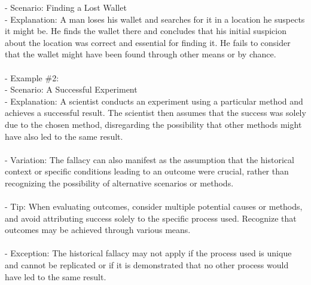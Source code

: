\documentclass[a4paper,12pt,single,pdftex]{scrbook}
\begin{document}
    
        - Scenario: Finding a Lost Wallet
    \\

    
        - Explanation: A man loses his wallet and searches for it in a location he suspects it might be. He finds the wallet there and concludes that his initial suspicion about the location was correct and essential for finding it. He fails to consider that the wallet might have been found through other means or by chance.
    \\

    
      
    \\

    
      - Example \#2:
    \\

    
        - Scenario: A Successful Experiment
    \\

    
        - Explanation: A scientist conducts an experiment using a particular method and achieves a successful result. The scientist then assumes that the success was solely due to the chosen method, disregarding the possibility that other methods might have also led to the same result.
    \\

    
      
    \\

    
      - Variation: The fallacy can also manifest as the assumption that the historical context or specific conditions leading to an outcome were crucial, rather than recognizing the possibility of alternative scenarios or methods.
    \\

    
      
    \\

    
      - Tip: When evaluating outcomes, consider multiple potential causes or methods, and avoid attributing success solely to the specific process used. Recognize that outcomes may be achieved through various means.
    \\

    
      
    \\

    
      - Exception: The historical fallacy may not apply if the process used is unique and cannot be replicated or if it is demonstrated that no other process would have led to the same result.
    \\
\end{document}
